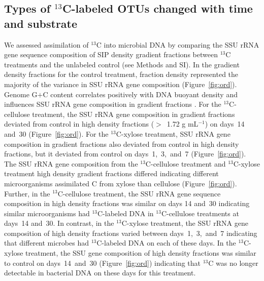 \subsection{Types of $^{13}$C-labeled OTUs changed with time and substrate}
We assessed assimilation of $^{13}$C into microbial DNA by comparing the SSU
rRNA gene sequence composition of SIP density gradient fractions between
$^{13}$C treatments and the unlabeled control (see Methods and SI). In the
gradient density fractions for the control treatment, fraction density
represented the majority of the variance in SSU rRNA gene composition
(Figure~\ref{fig:ord}). Genome G$+$C content correlates positively with DNA
buoyant density and influences SSU rRNA gene composition in gradient fractions
\citep{Buckley_2007}. For the $^{13}$C-cellulose treatment, the SSU rRNA gene
composition in gradient fractions deviated from control in high density
fractions ($>$~1.72 g mL$^{-1}$) on days~14 and~30 (Figure~\ref{fig:ord}). For
the $^{13}$C-xylose treatment, SSU rRNA gene composition in gradient
fractions also deviated from control in high density fractions, but it deviated
from control on days~1,~3,~and~7 (Figure~\ref{fig:ord}). The SSU rRNA gene
composition from the $^{13}$C-cellulose treatment and $^{13}$C-xylose treatment
high density gradient fractions differed indicating different microorganisms
assimilated C from xylose than cellulose (Figure~\ref{fig:ord}). Further, in
the $^{13}$C-cellulose treatment, the SSU rRNA gene sequence composition in
high density fractions was similar on days 14 and~30 indicating similar
microorganisms had $^{13}$C-labeled DNA in $^{13}$C-cellulose treatments at
days~14 and~30. In contrast, in the $^{13}$C-xylose treatment, the SSU rRNA
gene composition of high density fractions varied between days~1,~3,~and~7
indicating that different microbes had $^{13}$C-labeled DNA on each of these
days. In the $^{13}$C-xylose treatment, the SSU gene composition of high
density fractions was similar to control on days~14~and~30
(Figure~\ref{fig:ord}) indicating that $^{13}$C was no longer detectable in
bacterial DNA on these days for this treatment. 

